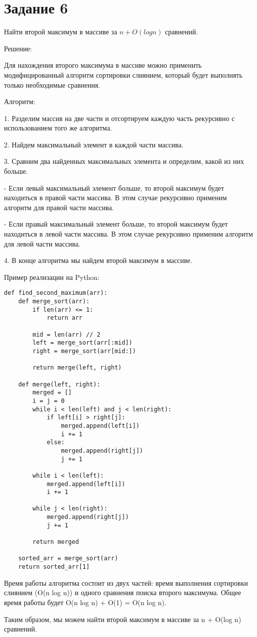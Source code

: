 
\section*{Задание 6}

Найти второй максимум в массиве за $n + O(log n)$ сравнений.

Решение:

Для нахождения второго максимума в массиве можно применить модифицированный алгоритм сортировки слиянием, который будет выполнять только необходимые сравнения.

Алгоритм:

1. Разделим массив на две части и отсортируем каждую часть рекурсивно с использованием того же алгоритма.

2. Найдем максимальный элемент в каждой части массива.

3. Сравним два найденных максимальных элемента и определим, какой из них больше.
   
- Если левый максимальный элемент больше, то второй максимум будет находиться в правой части массива. В этом случае рекурсивно применим алгоритм для правой части массива.

- Если правый максимальный элемент больше, то второй максимум будет находиться в левой части массива. В этом случае рекурсивно применим алгоритм для левой части массива.

4. В конце алгоритма мы найдем второй максимум в массиве.

Пример реализации на Python:
\begin{verbatim}
def find_second_maximum(arr):
    def merge_sort(arr):
        if len(arr) <= 1:
            return arr

        mid = len(arr) // 2
        left = merge_sort(arr[:mid])
        right = merge_sort(arr[mid:])

        return merge(left, right)

    def merge(left, right):
        merged = []
        i = j = 0
        while i < len(left) and j < len(right):
            if left[i] > right[j]:
                merged.append(left[i])
                i += 1
            else:
                merged.append(right[j])
                j += 1

        while i < len(left):
            merged.append(left[i])
            i += 1

        while j < len(right):
            merged.append(right[j])
            j += 1

        return merged

    sorted_arr = merge_sort(arr)
    return sorted_arr[1]
\end{verbatim}

Время работы алгоритма состоит из двух частей: время выполнения сортировки слиянием (O(n log n)) и одного сравнения поиска второго максимума. Общее время работы будет O(n log n) + O(1) = O(n log n).

Таким образом, мы можем найти второй максимум в массиве за n + O(log n) сравнений.